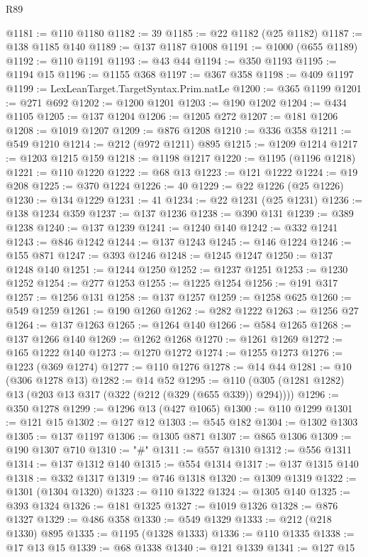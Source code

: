 \begin{lexlean}{R89}
\begin{coremodule}
@1181 := @110 @1180
@1182 := 39
@1185 := @22 @1182 (@25 @1182)
@1187 := @138 @1185 @140
@1189 := @137 @1187 @1008
@1191 := @1000 (@655 @1189)
@1192 := @110 @1191
@1193 := @43 @44
@1194 := @350 @1193
@1195 := @1194 @15
@1196 := @1155 @368
@1197 := @367 @358
@1198 := @409 @1197
@1199 := LexLeanTarget.TargetSyntax.Prim.natLe
@1200 := @365 @1199
@1201 := @271 @692
@1202 := @1200 @1201
@1203 := @190 @1202
@1204 := @434 @1105
@1205 := @137 @1204
@1206 := @1205 @272
@1207 := @181 @1206
@1208 := @1019 @1207
@1209 := @876 @1208
@1210 := @336 @358
@1211 := @549 @1210
@1214 := @212 (@972 @1211) @895
@1215 := @1209 @1214
@1217 := @1203 @1215 @159
@1218 := @1198 @1217
@1220 := @1195 (@1196 @1218)
@1221 := @110 @1220
@1222 := @68 @13
@1223 := @121 @1222
@1224 := @19 @208
@1225 := @370 @1224
@1226 := 40
@1229 := @22 @1226 (@25 @1226)
@1230 := @134 @1229
@1231 := 41
@1234 := @22 @1231 (@25 @1231)
@1236 := @138 @1234 @359
@1237 := @137 @1236
@1238 := @390 @131
@1239 := @389 @1238
@1240 := @137 @1239
@1241 := @1240 @140
@1242 := @332 @1241
@1243 := @846 @1242
@1244 := @137 @1243
@1245 := @146 @1224
@1246 := @155 @871
@1247 := @393 @1246
@1248 := @1245 @1247
@1250 := @137 @1248 @140
@1251 := @1244 @1250
@1252 := @1237 @1251
@1253 := @1230 @1252
@1254 := @277 @1253
@1255 := @1225 @1254
@1256 := @191 @317
@1257 := @1256 @131
@1258 := @137 @1257
@1259 := @1258 @625
@1260 := @549 @1259
@1261 := @190 @1260
@1262 := @282 @1222
@1263 := @1256 @27
@1264 := @137 @1263
@1265 := @1264 @140
@1266 := @584 @1265
@1268 := @137 @1266 @140
@1269 := @1262 @1268
@1270 := @1261 @1269
@1272 := @165 @1222 @140
@1273 := @1270 @1272
@1274 := @1255 @1273
@1276 := @1223 (@369 @1274)
@1277 := @110 @1276
@1278 := @14 @44
@1281 := @10 (@306 @1278 @13)
@1282 := @14 @52
@1295 := @110 (@305 (@1281 @1282) @13 (@203 @13 @317 (@322 (@212 (@329 (@655 @339)) @294))))
@1296 := @350 @1278
@1299 := @1296 @13 (@427 @1065)
@1300 := @110 @1299
@1301 := @121 @15
@1302 := @127 @12
@1303 := @545 @182
@1304 := @1302 @1303
@1305 := @137 @1197
@1306 := @1305 @871
@1307 := @865 @1306
@1309 := @190 @1307 @710
@1310 := "#"
@1311 := @557 @1310
@1312 := @556 @1311
@1314 := @137 @1312 @140
@1315 := @554 @1314
@1317 := @137 @1315 @140
@1318 := @332 @1317
@1319 := @746 @1318
@1320 := @1309 @1319
@1322 := @1301 (@1304 @1320)
@1323 := @110 @1322
@1324 := @1305 @140
@1325 := @393 @1324
@1326 := @181 @1325
@1327 := @1019 @1326
@1328 := @876 @1327
@1329 := @486 @358
@1330 := @549 @1329
@1333 := @212 (@218 @1330) @895
@1335 := @1195 (@1328 @1333)
@1336 := @110 @1335
@1338 := @17 @13 @15
@1339 := @68 @1338
@1340 := @121 @1339
@1341 := @127 @15

\end{coremodule}
\end{lexlean}
